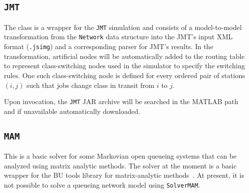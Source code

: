 \subsection{\texttt{JMT}}
The class is a wrapper for the \texttt{JMT} simulation and consists of a model-to-model transformation from the \texttt{Network} data structure into the JMT's input XML format (\texttt{.jsimg}) and a corresponding parser for JMT's results. In the transformation, artificial nodes will be automatically added to the routing table to represent class-switching nodes used in the simulator to specify the switching rules. One such class-switching node is defined for every ordered pair of stations $(i,j)$ such that jobs change class in transit from $i$ to $j$.

Upon invocation, the \texttt{JMT} JAR archive will be searched in the MATLAB path and if unavailable automatically downloaded.

\subsection{\texttt{MAM}}
This is a basic solver for some Markovian open queueing systems that can be analyzed using matrix analytic methods. The solver at the moment is a basic wrapper for the {BU tools} library for matrix-analytic methods~\cite{Hor17}. At present, it is not possible to solve a queueing network model using \texttt{SolverMAM}.



